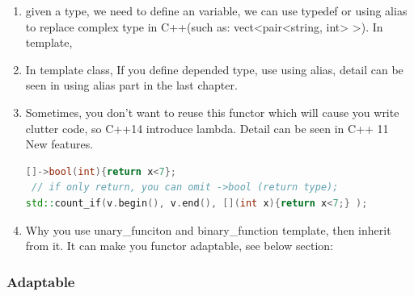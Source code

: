 \documentclass[a4paper,12pt,twoside]{book}
\begin{document}
\begin{enumerate}
\item given a type, we need to define an variable, we can use typedef or using alias to replace complex type in C++(such as: vect<pair<string, int> >). In template,
\item In template class, If you define depended type, use using alias, detail can be seen in using alias part in the last chapter.

\item Sometimes, you don't want to reuse this functor which will cause you write clutter code, so C++14 introduce lambda.  Detail can be seen in C++ 11 New features.
\begin{lstlisting}[frame=single, language=c++]
 []->bool(int){return x<7};
 // if only return, you can omit ->bool (return type);
std::count_if(v.begin(), v.end(), [](int x){return x<7;} );
\end{lstlisting}

\item Why you use  unary\_funciton and binary\_function template, then inherit from it.  It can make you functor adaptable, see below section:
\end{enumerate}

\subsubsection{Adaptable}
\end{document}
